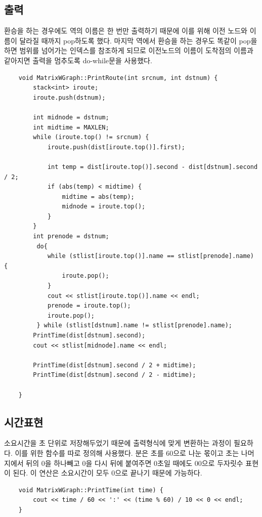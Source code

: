 \documentclass{oblivoir}
\begin{document}
\subsection{출력}
환승을 하는 경우에도 역의 이름은 한 번만 출력하기 때문에 이를 위해 이전 노드와 이름이 달라질 때까지 pop하도록 했다. 마지막 역에서 환승을 하는 경우도 똑같이 pop을 하면 범위를 넘어가는 인덱스를 참조하게 되므로 이전노드의 이름이 도착점의 이름과 같아지면 출력을 멈추도록 do-while문을 사용했다. 

\begin{verbatim}
    void MatrixWGraph::PrintRoute(int srcnum, int dstnum) {
    	stack<int> iroute;
    	iroute.push(dstnum);
    
    	int midnode = dstnum;
    	int midtime = MAXLEN;
    	while (iroute.top() != srcnum) {
    		iroute.push(dist[iroute.top()].first);
    
    		int temp = dist[iroute.top()].second - dist[dstnum].second / 2;
    		if (abs(temp) < midtime) {
    			midtime = abs(temp);
    			midnode = iroute.top();
    		}
    	}
    	int prenode = dstnum;
    	 do{
    		while (stlist[iroute.top()].name == stlist[prenode].name) {
    			iroute.pop();
    		}
    		cout << stlist[iroute.top()].name << endl;
    		prenode = iroute.top();
    		iroute.pop();
    	 } while (stlist[dstnum].name != stlist[prenode].name);
    	PrintTime(dist[dstnum].second);
    	cout << stlist[midnode].name << endl;
    
    	PrintTime(dist[dstnum].second / 2 + midtime);
    	PrintTime(dist[dstnum].second / 2 - midtime);
    
    }
\end{verbatim}

\subsection{시간표현}
소요시간을 초 단위로 저장해두었기 때문에 출력형식에 맞게 변환하는 과정이 필요하다. 이를 위한 함수를 따로 정의해 사용했다.
분은 초를 60으로 나눈 몫이고 초는 나머지에서 뒤의 0을 하나빼고 0을 다시 뒤에 붙여주면 0초일 때에도 00으로 두자릿수 표현이 된다. 이 연산은 소요시간이 모두 0으로 끝나기 때문에 가능하다.
\begin{verbatim}
    void MatrixWGraph::PrintTime(int time) {
    	cout << time / 60 << ':' << (time % 60) / 10 << 0 << endl;
    }
\end{verbatim}
\end{document}
